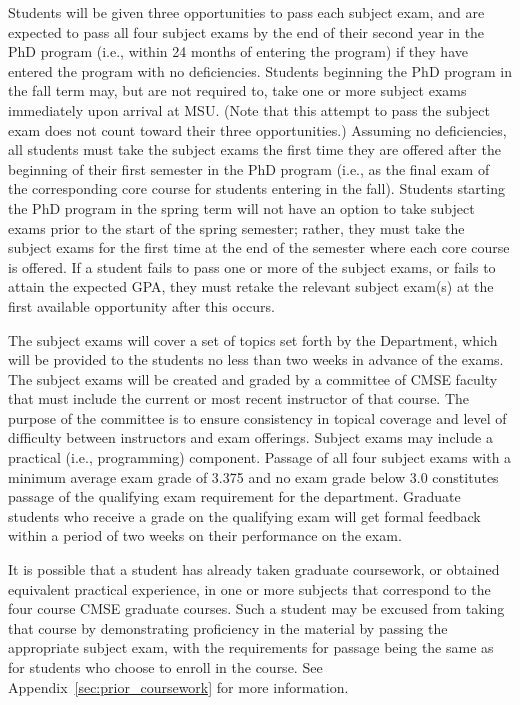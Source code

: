 Students will be given three opportunities to pass each subject exam,
and are expected to pass all four subject exams by the end of their second year
in the PhD program (i.e., within 24 months of entering the program) if
they have entered the program with no deficiencies.
Students beginning the PhD program in the fall
term may, but are not required to, take one or more subject exams
immediately upon arrival at MSU.  (Note that this attempt to pass the
subject exam does not count toward their three opportunities.)  
Assuming no deficiencies, all
students must take the subject exams the first time they are offered
after the beginning of their first semester in the PhD program (i.e.,
as the final exam of the corresponding core course for students
entering in the fall).  Students starting the PhD program in the
spring term will not have an option to take subject exams prior to the
start of the spring semester; rather, they must take the subject exams
for the first time at the end of the semester where each core course
is offered.  If a student fails to pass one or more of the subject
exams, or fails to attain the expected GPA, they must retake the
relevant subject exam(s) at the first available opportunity after this
occurs.

The subject exams will cover a set of topics set forth by the
Department, which will be provided to the students no less than two weeks in advance of the
exams. The subject exams will be created and graded by a committee of
CMSE faculty that must include the current or most recent instructor
of that course.  The purpose of the committee is to ensure consistency
in topical coverage and level of difficulty between instructors and
exam offerings.  Subject exams may include a practical (i.e.,
programming) component.  Passage of all four subject exams with a
minimum average exam grade of 3.375 and no exam grade below 3.0
constitutes passage of the qualifying exam requirement for the
department.  Graduate students who receive a grade on the qualifying
exam will get formal feedback within a period of  two weeks on
their performance on the exam.


It is possible that a student has already taken graduate coursework,
or obtained equivalent practical experience, in one or more subjects
that correspond to the four course CMSE graduate courses.  Such a
student may be excused from taking that course by demonstrating
proficiency in the material by passing the appropriate subject exam,
with the requirements for passage being the same as for students who
choose to enroll in the course.  See
Appendix~\ref{sec:prior_coursework} for more information.

